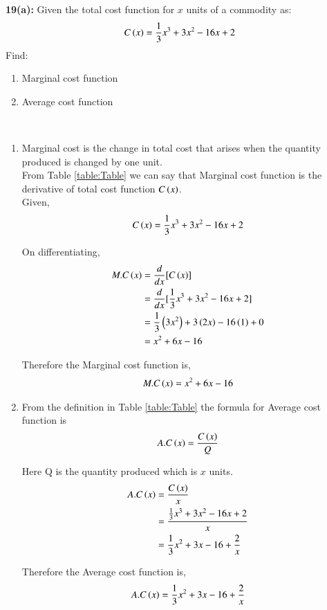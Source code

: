 \documentclass[journal,12pt,twocolumn]{IEEEtran}
\begin{document}
\textbf{19(a):} 
   Given the total cost function for $x$ units of a commodity as:
\begin{align*}
  C\left(x\right) = \frac{1}{3}x^3 + 3x^2 - 16x +2
\end{align*}
   Find:
\begin{enumerate}[ label=(\roman*)]
\item Marginal cost function
\item Average cost function
\end{enumerate}

\solution 
\begin{table}[!htb]
\centering

\caption{}
\label{table:Table}
\end{table} \\

\begin{enumerate}[ label=(\roman*)]
\item Marginal cost is the change in total cost that arises when the quantity produced is changed by one unit.\\
From Table
\eqref{table:Table}
we can say that Marginal cost function is the derivative of total cost function $C\left(x\right)$.\\
          
Given,
\begin{align}
  C\left(x\right) = \frac{1}{3}x^3 + 3x^2 - 16x +2
\end{align}
          
On differentiating,
\begin{align}
  M.C\left(x\right) &= \frac{d}{dx} [C\left(x\right)]\\
              &= \frac{d}{dx} [\frac{1}{3}x^3 + 3x^2 - 16x +2] \\
              &= \frac{1}{3}\left(3x^2\right) + 3\left(2x\right)-16\left(1\right)+0 \\
              &= x^2+6x-16
\end{align}  
          
Therefore the Marginal cost function is,
\begin{align*}
  M.C\left(x\right)=x^2+6x-16
\end{align*}        
      
\item From the definition in Table
\eqref{table:Table}
the formula for Average cost function is
\begin{align}
  A.C\left(x\right)=\frac{C\left(x\right)}{Q}
\end{align}
         
Here Q is the quantity produced which is $x$ units.
\begin{align}
  A.C\left(x\right) &=\frac{C\left(x\right)}{x} \\
              &=\frac{\frac{1}{3}x^3 + 3x^2 - 16x +2}{x} \\
              &=\frac{1}{3}x^2 + 3x - 16 +\frac{2}{x}
\end{align}    
                  
Therefore the Average cost function is,
\begin{align*}
  A.C\left(x\right)=\frac{1}{3}x^2 + 3x - 16 +\frac{2}{x}
\end{align*}
         
\end{enumerate}
  
\end{document}
